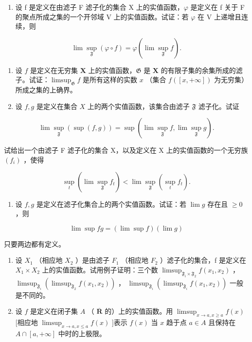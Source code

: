 \begin{enumerate}
\def\labelenumi{\alph{enumi})}
\setcounter{enumi}{1}
\tightlist
\item
设 f 是定义在由滤子 F 滤子化的集合 X 上的实值函数，\(\varphi\) 是定义在 f 关于 F 的聚点所成之集的一个开邻域 V 上的实值函数。试证：若 \(\varphi\) 在 V 上递增且连续，则
\end{enumerate}

\[
\lim \sup _ {\mathfrak {F}} (\varphi \circ f) = \varphi (\lim \sup _ {\mathfrak {F}} f).
\]

\begin{enumerate}
\def\labelenumi{\arabic{enumi})}
\setcounter{enumi}{2}
\item
设 \(f\) 是定义在无穷集 \(\mathbf{X}\) 上的实值函数，\(\mathfrak{G}\) 是 \(\mathbf{X}\) 的有限子集的余集所成的滤子。试证：\(\limsup_{\mathfrak{G}} f\) 是所有这样的实数 \(x\) （集合 \(f([x, +\infty])\) 为无穷集）所成之集的上确界。
\item
设 \(f, g\) 是定义在集合 \(X\) 上的两个实值函数，该集合由滤子 \(\mathfrak{F}\) 滤子化。试证
\end{enumerate}

\[
\lim \sup _ {\mathfrak {F}} (\sup (f, g)) = \sup (\lim \sup _ {\mathfrak {F}} f, \lim \sup _ {\mathfrak {F}} g).
\]

试给出一个由滤子 F 滤子化的集合 X，以及定义在 X 上的实值函数的一个无穷族 \((f_{i})\) ，使得

\[
\sup _ {t} (\lim \sup _ {\mathfrak {F}} f _ {t}) <   \lim \sup _ {\mathfrak {F}} (\sup _ {t} f _ {t}).
\]

\begin{enumerate}
\def\labelenumi{\arabic{enumi})}
\setcounter{enumi}{4}
\tightlist
\item
设 \(f, g\) 是定义在滤子化集合上的两个实值函数。试证：若 \(\lim g\) 存在且 \(\geqslant 0\) ，则
\end{enumerate}

\[
\lim \sup f g = (\lim \sup f) (\lim g)
\]

只要两边都有定义。

\begin{enumerate}
\def\labelenumi{\arabic{enumi})}
\setcounter{enumi}{5}
\item
设 \(X_{1}\) （相应地 \(X_{2}\) ）是由滤子 \(F_{1}\) （相应地 \(F_{2}\) ）滤子化的集合，f 是定义在 \(X_{1} \times X_{2}\) 上的实值函数。试用例子证明：三个数 \(\limsup_{\mathfrak{F}_{i} \times \mathfrak{F}_{2}} f(x_{1}, x_{2})\) ， \(\limsup_{\mathfrak{F}_{i}} (\limsup_{\mathfrak{F}_{2}} f(x_{1}, x_{2}))\) ， \(\limsup_{\mathfrak{F}_{i}} (\limsup_{\mathfrak{F}_{i}} f(x_{1}, x_{2}))\) 一般是不同的。
\item
设 \(f\) 是定义在闭子集 \(A\) （ \(\overline{\mathbf{R}}\) 的）上的实值函数。用 \(\limsup_{x \to a, x \geqslant a} f(x)\) {[}相应地 \(\limsup_{x \to a, x \leqslant a} f(x)\) {]}表示 \(f(x)\) 当 \(x\) 趋于点 \(a \in A\) 且保持在 \(A \cap [a, +\infty]\) 中时的上极限。
\end{enumerate}


